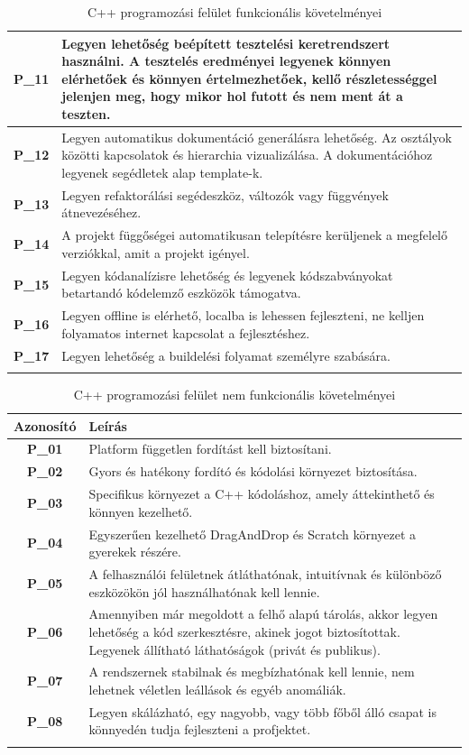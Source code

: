 \documentclass{article}
\begin{document}
\begin{longtable}{|c|p{14cm}|}
       \textbf{P\_11}  &  Legyen lehetőség beépített tesztelési keretrendszert használni. A tesztelés eredményei legyenek könnyen elérhetőek és könnyen értelmezhetőek, kellő részletességgel jelenjen meg, hogy mikor hol futott és nem ment át a teszten.\\\hline
       \textbf{P\_12}  &  Legyen automatikus dokumentáció generálásra lehetőség. Az osztályok közötti kapcsolatok és hierarchia vizualizálása. A dokumentációhoz legyenek segédletek alap template-k. \\\hline
       \textbf{P\_13}  &  Legyen refaktorálási segédeszköz, változók vagy függvények átnevezéséhez. \\\hline
       \textbf{P\_14}  &  A projekt függőségei automatikusan telepítésre kerüljenek a megfelelő verziókkal, amit a projekt igényel. \\\hline
       \textbf{P\_15}  &  Legyen kódanalízisre lehetőség és legyenek kódszabványokat betartandó kódelemző eszközök támogatva. \\\hline
       \textbf{P\_16}  &  Legyen offline is elérhető, localba is lehessen fejleszteni, ne kelljen folyamatos internet kapcsolat a fejlesztéshez.  \\\hline
       \textbf{P\_17}  &  Legyen lehetőség a buildelési folyamat személyre szabására.\\\hline
\hline
\caption{C++ programozási felület funkcionális követelményei}
\end{longtable}
\endgroup

\begingroup
\centering
\begin{longtable}{|c|p{14cm}|}
\hline
\textbf{Azonosító} & \textbf{Leírás}        \\ 
\hline
       \textbf{P\_01}  &  Platform független fordítást kell biztosítani. \\\hline
       \textbf{P\_02}  &  Gyors és hatékony fordító és kódolási környezet biztosítása. \\\hline
       \textbf{P\_03}  &  Specifikus környezet a C++ kódoláshoz, amely áttekinthető és könnyen kezelhető. \\\hline
       \textbf{P\_04}  &  Egyszerűen kezelhető DragAndDrop és Scratch környezet a gyerekek részére. \\\hline
       \textbf{P\_05}  &  A felhasználói felületnek átláthatónak, intuitívnak és különböző eszközökön jól használhatónak kell lennie. \\\hline
       \textbf{P\_06}  &  Amennyiben már megoldott a felhő alapú tárolás, akkor legyen lehetőség a kód szerkesztésre, akinek jogot biztosítottak. Legyenek állítható láthatóságok (privát és publikus).  \\\hline
       \textbf{P\_07}  &  A rendszernek stabilnak és megbízhatónak kell lennie, nem lehetnek véletlen leállások és egyéb anomáliák.  \\\hline
       \textbf{P\_08}  &  Legyen skálázható, egy nagyobb, vagy több főből álló csapat is könnyedén tudja fejleszteni a profjektet. \\\hline
\hline
\caption{C++ programozási felület nem funkcionális követelményei}
\end{longtable}
\endgroup
\end{document}
